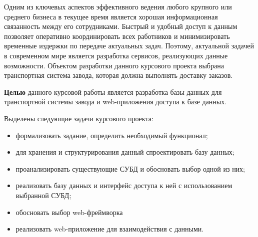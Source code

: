 Одним из ключевых аспектов эффективного ведения любого крупного или среднего бизнеса в текущее время является хорошая информационная связанность между его сотрудниками. Быстрый и удобный доступ к данным позволяет оперативно координировать всех работников и минимизировать временные издержки по передаче актуальных задач. Поэтому, актуальной задачей в современном мире является разработка сервисов, реализующих данные возможности. Объектом разработки данного курсового проекта выбрана транспортная система завода, которая должна выполнять доставку заказов.

\textbf{Целью} данного курсовой работы является разработка базы данных для транспортной системы завода и web-приложения доступа к базе данных.

Выделены следующие задачи курсового проекта:
\begin{itemize}
	\item формализовать задание, определить необходимый функционал;
	\item для хранения и структурирования данный спроектировать базу данных;
	\item проанализировать существующие СУБД и обосновать выбор одной из них;
	\item реализовать базу данных и интерфейс доступа к ней с использованием выбранной СУБД;
	\item обосновать выбор web-фреймворка
	\item реализовать web-приложение для взаимодействия с данными.
\end{itemize}
